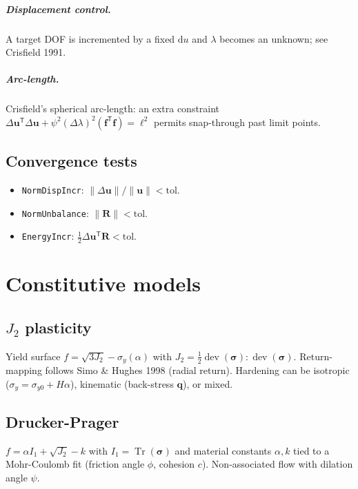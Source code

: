 \documentclass[11pt,a4paper]{report}
\newcommand{\bs}[1]{\boldsymbol{#1}}
\newcommand{\Tr}{\operatorname{Tr}}
\newcommand{\dev}{\operatorname{dev}}
\begin{document}
\paragraph{Displacement control.}  A target DOF is incremented by a
fixed $\mathrm{d} u$ and $\lambda$ becomes an unknown; see Crisfield
1991.

\paragraph{Arc-length.}  Crisfield's spherical arc-length: an extra
constraint $\Delta \bs u^{\mathsf T} \Delta \bs u + \psi^2
(\Delta\lambda)^2 (\bs f^{\mathsf T} \bs f) = \ell^2$ permits
snap-through past limit points.

\section{Convergence tests}

\begin{itemize}
  \item \texttt{NormDispIncr}: $\| \Delta \bs u \| / \| \bs u \| < \mathrm{tol}$.
  \item \texttt{NormUnbalance}: $\| \bs R \| < \mathrm{tol}$.
  \item \texttt{EnergyIncr}: $\frac{1}{2} \Delta \bs u^{\mathsf T} \bs R < \mathrm{tol}$.
\end{itemize}

\chapter{Constitutive models}
\label{ch:constitutive}

\section{$J_2$ plasticity}

Yield surface $f = \sqrt{3 J_2} - \sigma_y(\alpha)$ with $J_2 =
\tfrac{1}{2} \dev(\bs\sigma) : \dev(\bs\sigma)$.  Return-mapping
follows Simo \& Hughes 1998 (radial return).  Hardening can be
isotropic ($\sigma_y = \sigma_{y0} + H \alpha$), kinematic (back-stress
$\bs q$), or mixed.

\section{Drucker-Prager}

$f = \alpha I_1 + \sqrt{J_2} - k$ with $I_1 = \Tr(\bs\sigma)$ and
material constants $\alpha, k$ tied to a Mohr-Coulomb fit (friction
angle $\phi$, cohesion $c$).  Non-associated flow with dilation angle
$\psi$.
\end{document}
